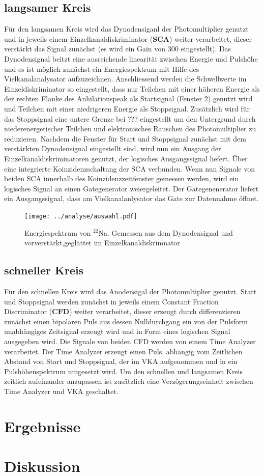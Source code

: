 \documentclass[a4paper,12pt]{article}
\begin{document}
\subsection*{langsamer Kreis}
	Für den langsamen Kreis wird das Dynodensiganl der Photomultiplier genutzt und in jeweils einem 
	Einzelkanaldiskriminator (\textbf{SCA}) weiter verarbeitet, dieser verstärkt das Signal zunächst (es wird
	ein Gain von 300 eingestellt). 
	Das Dynodensignal beitzt eine ausreichende linearität zwischen Energie und Pulshöhe und es ist möglich
	zunächst ein Energiespektrum mit Hilfe des Vielkanalanalysator aufzuzeichnen.
	Anschliessend werden die Schwellwerte im Einzeldiskriminator so eingestellt, dass nur Teilchen mit einer höheren
	Energie als der rechten Flanke des Anhilationspeak als Startsignal (Fenster 2) genutzt wird und Teilchen
	mit einer niedrigeren Energie als Stoppsignal. Zusätzlich wird für das Stoppsignal eine untere Grenze bei ???
	eingestellt um den Untergrund durch niederenergetischer Teilchen und elektronisches Rauschen des Photomultiplier
	zu reduzieren. Nachdem die Fenster für Start und Stoppsignal zunächst mit dem verstärkten Dynodensignal eingestellt sind,
	wird nun ein Ausgang der Einzelkanaldiskriminatoren genutzt, der logisches Ausgangssignal liefert.
	Über eine integrierte Koinzidenzschaltung der SCA verbunden. Wenn nun Signale von beiden SCA innerhalb des Koinzidenzzeitfenster
	gemessen werden, wird ein logisches Signal an einen Gategenerator weiergeleitet. Der Gategenenerator liefert ein Ausgangssignal, dass
	am Vielkanalanlysator das Gate zur Datennahme öffnet.
\begin{figure}
		\texttt{[image: ../analyse/auswahl.pdf]}
		\caption{Energiespektrum von $^{22}$Na. Gemessen aus dem Dynodensignal und vorverstärkt,geglättet im Einzelkanaldiskrimnator}
		\label{fig:schaltplan}
\end{figure}


\subsection*{schneller Kreis}
	Für den schnellen Kreis wird das Anodensigal der Photomultiplier genutzt. Start und Stoppsignal werden zunächst in jeweils einem Constant
	Fraction Discriminator (\textbf{CFD}) weiter verarbeitet, dieser erzeugt durch differenzieren zunächst einen bipolaren Puls aus dessen Nulldurchgang
	ein von der Pulsform unabhängiges Zeitsignal erzeugt wird und in Form eines logischen Signal ausgegeben wird. Die Signale von beiden
	CFD werden von einem Time Analyzer verarbeitet. Der Time Analyzer erzeugt einen Puls, abhängig vom Zeitlichen Abstand von Start und Stoppsignal,
	der im VKA aufgenommen und in ein Pulshöhenspektrum umgesetzt wird. Um den schnellen und langsamen Kreis zeitlich aufeinander 
	anzupassen ist zusätzlich eine Verzögerungseinheit zwischen Time Analyzer und VKA geschaltet.
\section{Ergebnisse}

\section{Diskussion}
\end{document}
